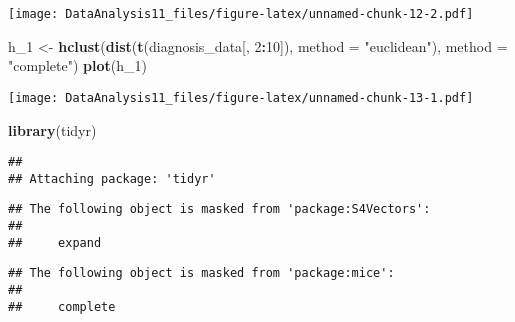 \documentclass[]{article}
\newenvironment{Shaded}{\begin{snugshade}}{\end{snugshade}}
\newcommand{\KeywordTok}[1]{\textcolor[rgb]{0.13,0.29,0.53}{\textbf{#1}}}
\newcommand{\DataTypeTok}[1]{\textcolor[rgb]{0.13,0.29,0.53}{#1}}
\newcommand{\DecValTok}[1]{\textcolor[rgb]{0.00,0.00,0.81}{#1}}
\newcommand{\FloatTok}[1]{\textcolor[rgb]{0.00,0.00,0.81}{#1}}
\newcommand{\StringTok}[1]{\textcolor[rgb]{0.31,0.60,0.02}{#1}}
\newcommand{\OperatorTok}[1]{\textcolor[rgb]{0.81,0.36,0.00}{\textbf{#1}}}
\newcommand{\NormalTok}[1]{#1}
\begin{document}
\texttt{[image: DataAnalysis11\_files/figure-latex/unnamed-chunk-12-2.pdf]}

\begin{Shaded}
\begin{Highlighting}[]
\NormalTok{h_}\DecValTok{1}\NormalTok{ <-}\StringTok{ }\KeywordTok{hclust}\NormalTok{(}\KeywordTok{dist}\NormalTok{(}\KeywordTok{t}\NormalTok{(diagnosis_data[, }\DecValTok{2}\OperatorTok{:}\DecValTok{10}\NormalTok{]), }\DataTypeTok{method =} \StringTok{"euclidean"}\NormalTok{), }\DataTypeTok{method =} \StringTok{"complete"}\NormalTok{)}
\KeywordTok{plot}\NormalTok{(h_}\DecValTok{1}\NormalTok{)}
\end{Highlighting}
\end{Shaded}

\texttt{[image: DataAnalysis11\_files/figure-latex/unnamed-chunk-13-1.pdf]}

\begin{Shaded}
\begin{Highlighting}[]
\KeywordTok{library}\NormalTok{(tidyr)}
\end{Highlighting}
\end{Shaded}

\begin{verbatim}
## 
## Attaching package: 'tidyr'
\end{verbatim}

\begin{verbatim}
## The following object is masked from 'package:S4Vectors':
## 
##     expand
\end{verbatim}

\begin{verbatim}
## The following object is masked from 'package:mice':
## 
##     complete
\end{verbatim}

\begin{Shaded}
\end{Shaded}
\end{document}
